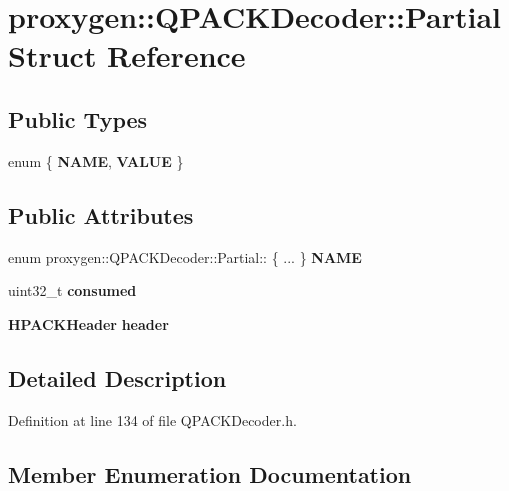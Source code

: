 \section{proxygen\+:\+:Q\+P\+A\+C\+K\+Decoder\+:\+:Partial Struct Reference}
\label{structproxygen_1_1QPACKDecoder_1_1Partial}
\subsection*{Public Types}
\begin{DoxyCompactItemize}
\item 
enum \{ {\bf N\+A\+ME}, 
{\bf V\+A\+L\+UE}
 \}
\end{DoxyCompactItemize}
\subsection*{Public Attributes}
\begin{DoxyCompactItemize}
\item 
enum proxygen\+::\+Q\+P\+A\+C\+K\+Decoder\+::\+Partial\+:: \{ ... \}  {\bf N\+A\+ME}
\item 
uint32\+\_\+t {\bf consumed}
\item 
{\bf H\+P\+A\+C\+K\+Header} {\bf header}
\end{DoxyCompactItemize}


\subsection{Detailed Description}


Definition at line 134 of file Q\+P\+A\+C\+K\+Decoder.\+h.



\subsection{Member Enumeration Documentation}
